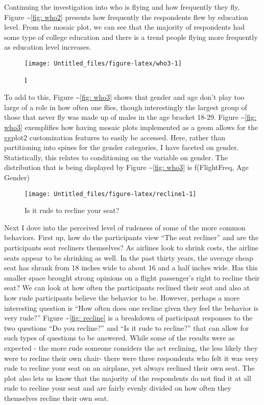Continuing the investigation into who is flying and how frequently they
fly, Figure \textasciitilde{}\ref{fig: who2} presents how frequently the
respondents flew by education level. From the mosaic plot, we can see
that the majority of respondents had some type of college education and
there is a trend people flying more frequently as education level
increases.

\begin{Schunk}
\begin{figure}
\texttt{[image: Untitled\_files/figure-latex/who3-1]} \caption[I]{I}\label{fig:who3}
\end{figure}
\end{Schunk}

To add to this, Figure \textasciitilde{}\ref{fig: who3} shows that
gender and age don't play too large of a role in how often one flies,
though interestingly the largest group of those that never fly was made
up of males in the age bracket 18-29. Figure
\textasciitilde{}\ref{fig: who3} exemplifies how having mosaic plots
implemented as a geom allows for the ggplot2 customization features to
easily be accessed. Here, rather than partitioning into spines for the
gender categories, I have faceted on gender. Statistically, this relates
to conditioning on the variable on gender. The distribution that is
being displayed by Figure \textasciitilde{}\ref{fig: who3} is
f(FlightFreq, Age \textbar{}Gender)

\begin{Schunk}
\begin{figure}
\texttt{[image: Untitled\_files/figure-latex/recline1-1]} \caption[Is it rude to recline your seat?]{Is it rude to recline your seat?}\label{fig:recline1}
\end{figure}
\end{Schunk}

Next I dove into the perceived level of rudeness of some of the more
common behaviors. First up, how do the participants view ``The seat
recliner'' and are the participants seat recliners themselves? As
airlines look to shrink costs, the airline seats appear to be shrinking
as well. In the past thirty years, the average cheap seat has shrank
from 18 inches wide to about 16 and a half inches wide. \citet{washpost}
Has this smaller space brought strong opinions on a flight passenger's
right to recline their seat? We can look at how often the participants
reclined their seat and also at how rude participants believe the
behavior to be. However, perhaps a more interesting question is ``How
often does one recline given they feel the behavior is very rude?''
Figure \textasciitilde{}\ref{fig: recline} is a breakdown of participant
responses to the two questions ``Do you recline?'' and ``Is it rude to
recline?'' that can allow for such types of questions to be answered.
While some of the results were as expected - the more rude someone
considers the act reclining, the less likely they were to recline their
own chair- there were three respondents who felt it was very rude to
recline your seat on an airplane, yet always reclined their own seat.
The plot also lets us know that the majority of the respondents do not
find it at all rude to recline your seat and are fairly evenly divided
on how often they themselves recline their own seat.

